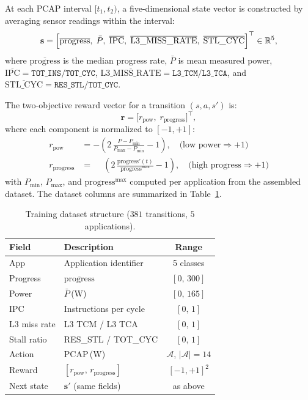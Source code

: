   At each PCAP interval $[t_1, t_2)$, a five-dimensional state vector is
  constructed by averaging sensor readings within the interval:
  \begin{equation}
      \mathbf{s} = \Bigl[
          \overline{\mathrm{progress}},\;
          \bar{P},\;
          \overline{\text{IPC}},\;
          \overline{\text{L3\_MISS\_RATE}},\;
          \overline{\text{STL\_CYC}}
      \Bigr]^{\top} \in \mathbb{R}^{5},
  \end{equation}
  where $\overline{\mathrm{progress}}$ is the median progress rate, $\bar{P}$ is mean
  measured power, $\overline{\text{IPC}} = \texttt{TOT\_INS}/\texttt{TOT\_CYC}$,
  $\overline{\text{L3\_MISS\_RATE}} = \texttt{L3\_TCM}/\texttt{L3\_TCA}$, and
  $\overline{\text{STL\_CYC}} = \texttt{RES\_STL}/\texttt{TOT\_CYC}$.

  The two-objective reward vector for a transition $(s, a, s')$ is:
  \begin{equation}
      \mathbf{r} = \bigl[r_{\text{pow}},\; r_{\mathrm{progress}}\bigr]^{\top},
  \end{equation}
  where each component is normalized to $[-1, +1]$:
  \begin{align}
      r_{\text{pow}}  &= -\!\left(2\,\frac{P - P_{\min}}{P_{\max} - P_{\min}} - 1\right),
      \quad\text{(low power} \Rightarrow +1\text{)} \\
      r_{\mathrm{progress}} &= \phantom{-}\left(2\,\frac{\mathrm{progress}'(t)}{\mathrm{progress}^{\max}} - 1\right),
      \quad\text{(high progress} \Rightarrow +1\text{)}
  \end{align}
  with $P_{\min}$, $P_{\max}$, and $\mathrm{progress}^{\max}$ computed per
  application from the assembled dataset. The dataset columns are summarized in
  Table~\ref{tab:dataset}.

  \begin{table}[h]
  \centering
  \caption{Training dataset structure ($381$ transitions, $5$ applications).}
  \label{tab:dataset}
  \begin{tabular}{llc}
  \toprule
  \textbf{Field} & \textbf{Description} & \textbf{Range} \\
  \midrule
  App            & Application identifier        & 5 classes \\
  Progress       & $\overline{\mathrm{progress}}$       & $[0,\,300]$ \\
  Power          & $\bar{P}$\,(W)                & $[0,\,165]$ \\
  IPC            & Instructions per cycle        & $[0,\,1]$   \\
  L3 miss rate   & L3 TCM / L3 TCA              & $[0,\,1]$   \\
  Stall ratio    & RES\_STL / TOT\_CYC           & $[0,\,1]$   \\
  Action         & PCAP\,(W)                     & $\mathcal{A}$, $|\mathcal{A}|=14$ \\
  Reward         & $[r_{\text{pow}},\,r_{\mathrm{progress}}]$ & $[-1,+1]^2$ \\
  Next state     & $\mathbf{s}'$ (same fields)   & as above \\
  \bottomrule
  \end{tabular}
  \end{table}

